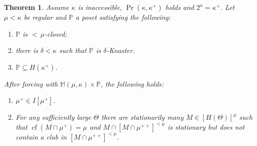\documentclass[a4paper]{amsart}
\theoremstyle{definition}
\theoremstyle{remark}
\theoremstyle{plain}
\newtheorem{mysen}[mydef]{Theorem}
\numberwithin{mydef}{section}
\DeclareMathOperator{\cf}{cf}
\newcommand{\dM}{\mathbb{M}}
\newcommand{\dP}{\mathbb{P}}
\begin{document}
	\begin{mysen}\label{DistOmnibus}
		Assume $\kappa$ is inaccessible, $\Pr(\kappa,\kappa^+)$ holds and $2^{\kappa}=\kappa^+$. Let $\mu<\kappa$ be regular and $\dP$ a poset satisfying the following:
		\begin{enumerate}
			\item $\dP$ is ${<}\,\mu$-closed;
			\item there is $\delta<\kappa$ such that $\dP$ is $\delta$-Knaster.
			\item $\dP\subseteq H(\kappa^+)$.
		\end{enumerate}
		After forcing with $\dM(\mu,\kappa)\times\dP$, the following holds:
		\begin{enumerate}
			\item $\mu^+\in I[\mu^+]$.
			\item For any sufficiently large $\Theta$ there are stationarily many $M\in[H(\Theta)]^{\mu}$ such that $\cf(M\cap\mu^+)=\mu$ and $M\cap[M\cap\mu^{++}]^{<\mu}$ is stationary but does not contain a club in $[M\cap\mu^{++}]^{<\mu}$.
		\end{enumerate}
	\end{mysen}
	
\end{document}

